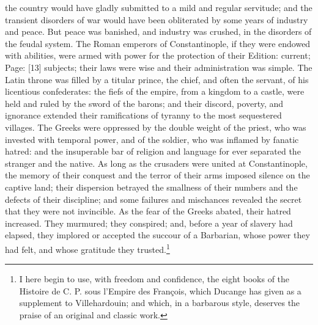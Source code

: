 the country would have gladly submitted to a mild and regular servitude; and the transient disorders of war would have been obliterated by some years of industry and peace. But peace was banished, and industry was crushed, in the disorders of the feudal system. The Roman emperors of Constantinople, if they were endowed with abilities, were armed with power for the protection of their Edition: current; Page: [13] subjects; their laws were wise and their administration was simple. The Latin throne was filled by a titular prince, the chief, and often the servant, of his licentious confederates: the fiefs of the empire, from a kingdom to a castle, were held and ruled by the sword of the barons; and their discord, poverty, and ignorance extended their ramifications of tyranny to the most sequestered villages. The Greeks were oppressed by the double weight of the priest, who was invested with temporal power, and of the soldier, who was inflamed by fanatic hatred: and the insuperable bar of religion and language for ever separated the stranger and the native. As long as the crusaders were united at Constantinople, the memory of their conquest and the terror of their arms imposed silence on the captive land; their dispersion betrayed the smallness of their numbers and the defects of their discipline; and some failures and mischances revealed the secret that they were not invincible. As the fear of the Greeks abated, their hatred increased. They murmured; they conspired; and, before a year of slavery had elapsed, they implored or accepted the succour of a Barbarian, whose power they had felt, and whose gratitude they trusted.\footnote{I here begin to use, with freedom and confidence, the eight books of the Histoire de C. P. sous l\texthebrew{}’Empire des François, which Ducange has given as a supplement to Villehardouin; and which, in a barbarous style, deserves the praise of an original and classic work.}

